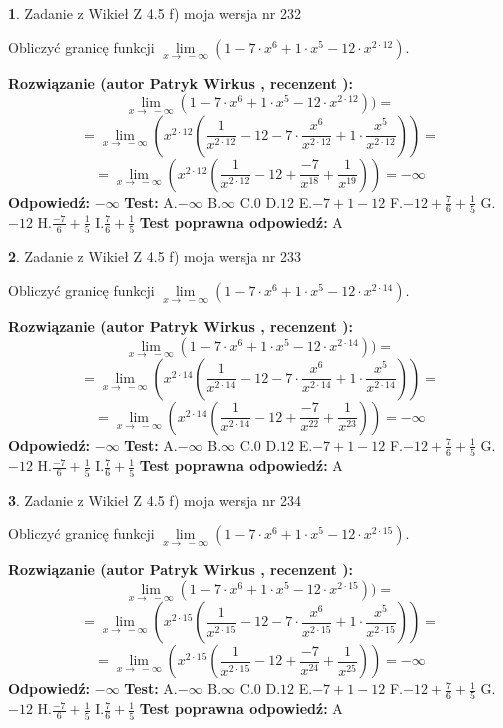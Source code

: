 \documentclass[12pt, a4paper]{article}
\theoremstyle{definition} %
\newtheorem{zad}{}
\newcommand{\zadStart}[1]{\begin{zad}#1\newline}
\newcommand{\zadStop}{\end{zad}}
\newcommand{\rozwStart}[2]{\noindent \textbf{Rozwiązanie (autor #1 , recenzent #2): }\newline}
\newcommand{\rozwStop}{\newline}
\newcommand{\odpStart}{\noindent \textbf{Odpowiedź:}\newline}
\newcommand{\odpStop}{\newline}
\newcommand{\testStart}{\noindent \textbf{Test:}\newline}
\newcommand{\testStop}{\newline}
\newcommand{\kluczStart}{\noindent \textbf{Test poprawna odpowiedź:}\newline}
\newcommand{\kluczStop}{\newline}
\begin{document}
\zadStart{Zadanie z Wikieł Z 4.5 f) moja wersja nr 232}



Obliczyć granicę funkcji  $\lim\limits_{x\to\ -\infty}(1 - 7 \cdot x^{6}+1 \cdot x^{5}- 12 \cdot x^{2\cdot12})$.
\zadStop
\rozwStart{Patryk Wirkus}{}
$$\lim\limits_{x\to\ -\infty}(1 - 7 \cdot x^{6}+1 \cdot x^{5}- 12 \cdot x^{2\cdot12}))=$$
$$=\lim\limits_{x\to\ -\infty}(x^{2\cdot12}(\frac{1}{x^{2\cdot12}}-12 -7 \cdot \frac{x^{6}}{x^{2\cdot12}}+1 \cdot \frac{x^{5}}{x^{2\cdot12}}))=$$
$$=\lim\limits_{x\to\ -\infty}(x^{2\cdot12}(\frac{1}{x^{2\cdot12}}-12 + \frac{-7}{x^{18}}+ \frac{1}{x^{19}}))=-\infty$$
\rozwStop
\odpStart
$-\infty$
\odpStop
\testStart
A.$-\infty$ B.$\infty$ C.$0$ D.$12$ E.$-7 + 1 - 12$
F.$-12+\frac{7}{6}+\frac{1}{5}$ G.$-12$
H.$\frac{-7}{6}+\frac{1}{5}$
I.$\frac{7}{6}+\frac{1}{5}$
\testStop
\kluczStart
A
\kluczStop



\zadStart{Zadanie z Wikieł Z 4.5 f) moja wersja nr 233}



Obliczyć granicę funkcji  $\lim\limits_{x\to\ -\infty}(1 - 7 \cdot x^{6}+1 \cdot x^{5}- 12 \cdot x^{2\cdot14})$.
\zadStop
\rozwStart{Patryk Wirkus}{}
$$\lim\limits_{x\to\ -\infty}(1 - 7 \cdot x^{6}+1 \cdot x^{5}- 12 \cdot x^{2\cdot14}))=$$
$$=\lim\limits_{x\to\ -\infty}(x^{2\cdot14}(\frac{1}{x^{2\cdot14}}-12 -7 \cdot \frac{x^{6}}{x^{2\cdot14}}+1 \cdot \frac{x^{5}}{x^{2\cdot14}}))=$$
$$=\lim\limits_{x\to\ -\infty}(x^{2\cdot14}(\frac{1}{x^{2\cdot14}}-12 + \frac{-7}{x^{22}}+ \frac{1}{x^{23}}))=-\infty$$
\rozwStop
\odpStart
$-\infty$
\odpStop
\testStart
A.$-\infty$ B.$\infty$ C.$0$ D.$12$ E.$-7 + 1 - 12$
F.$-12+\frac{7}{6}+\frac{1}{5}$ G.$-12$
H.$\frac{-7}{6}+\frac{1}{5}$
I.$\frac{7}{6}+\frac{1}{5}$
\testStop
\kluczStart
A
\kluczStop



\zadStart{Zadanie z Wikieł Z 4.5 f) moja wersja nr 234}



Obliczyć granicę funkcji  $\lim\limits_{x\to\ -\infty}(1 - 7 \cdot x^{6}+1 \cdot x^{5}- 12 \cdot x^{2\cdot15})$.
\zadStop
\rozwStart{Patryk Wirkus}{}
$$\lim\limits_{x\to\ -\infty}(1 - 7 \cdot x^{6}+1 \cdot x^{5}- 12 \cdot x^{2\cdot15}))=$$
$$=\lim\limits_{x\to\ -\infty}(x^{2\cdot15}(\frac{1}{x^{2\cdot15}}-12 -7 \cdot \frac{x^{6}}{x^{2\cdot15}}+1 \cdot \frac{x^{5}}{x^{2\cdot15}}))=$$
$$=\lim\limits_{x\to\ -\infty}(x^{2\cdot15}(\frac{1}{x^{2\cdot15}}-12 + \frac{-7}{x^{24}}+ \frac{1}{x^{25}}))=-\infty$$
\rozwStop
\odpStart
$-\infty$
\odpStop
\testStart
A.$-\infty$ B.$\infty$ C.$0$ D.$12$ E.$-7 + 1 - 12$
F.$-12+\frac{7}{6}+\frac{1}{5}$ G.$-12$
H.$\frac{-7}{6}+\frac{1}{5}$
I.$\frac{7}{6}+\frac{1}{5}$
\testStop
\kluczStart
A
\kluczStop
\end{document}
